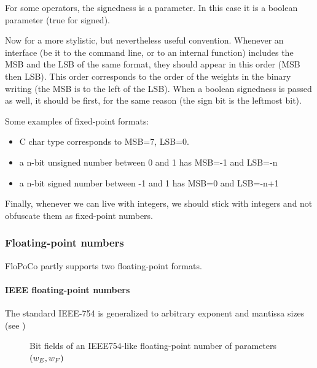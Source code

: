\documentclass{article}
\begin{document}
For some operators, the signedness is a parameter. In this case it is a boolean  parameter (true for signed).

Now for a more stylistic, but nevertheless useful convention.
Whenever an interface (be it to the command line, or to an internal function) includes the MSB and the LSB of the same format, they should appear in this order (MSB then LSB).
This order corresponds to the order of the weights in the binary writing (the MSB is to the left of the LSB). 
When a boolean signedness is passed as well, it should be first, for the same reason (the sign bit is the leftmost bit).

Some examples of fixed-point formats:
\begin{itemize}
\item C char type corresponds to MSB=7, LSB=0.
\item a n-bit unsigned number between 0 and 1 has MSB=-1 and LSB=-n
\item a n-bit signed number between -1 and 1 has MSB=0 and LSB=-n+1
\end{itemize}

Finally, whenever we can live with integers, we should stick with integers and not obfuscate them as fixed-point numbers.



 

\subsubsection{Floating-point numbers}

FloPoCo partly supports two floating-point formats.

\paragraph{IEEE floating-point numbers}
The standard IEEE-754 is generalized to arbitrary exponent and mantissa sizes (see )
 \begin{figure}[h]
   \centering
    \caption{Bit fields of an IEEE754-like  floating-point number of parameters $({w_E},{w_F})$}
   \label{fig:ieee-fp-format}
 \end{figure}
\end{document}
